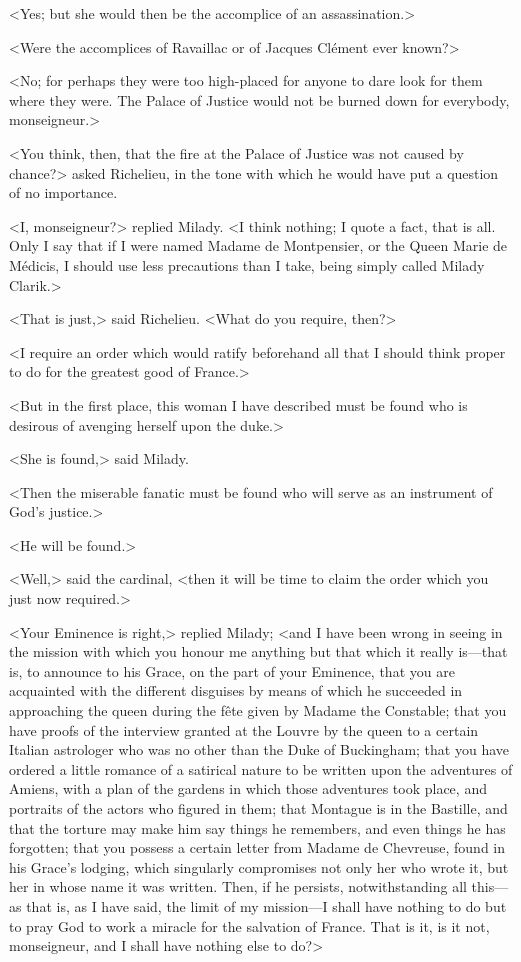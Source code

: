<Yes; but she would then be the accomplice of an assassination.> 

<Were the accomplices of Ravaillac or of Jacques Clément ever known?> 

<No; for perhaps they were too high-placed for anyone to dare look for them where they were. The Palace of Justice would not be burned down for everybody, monseigneur.> 

<You think, then, that the fire at the Palace of Justice was not caused by chance?> asked Richelieu, in the tone with which he would have put a question of no importance. 

<I, monseigneur?> replied Milady. <I think nothing; I quote a fact, that is all. Only I say that if I were named Madame de Montpensier, or the Queen Marie de Médicis, I should use less precautions than I take, being simply called Milady Clarik.> 

<That is just,> said Richelieu. <What do you require, then?> 

<I require an order which would ratify beforehand all that I should think proper to do for the greatest good of France.> 

<But in the first place, this woman I have described must be found who is desirous of avenging herself upon the duke.> 

<She is found,> said Milady. 

<Then the miserable fanatic must be found who will serve as an instrument of God's justice.> 

<He will be found.> 

<Well,> said the cardinal, <then it will be time to claim the order which you just now required.> 

<Your Eminence is right,> replied Milady; <and I have been wrong in seeing in the mission with which you honour me anything but that which it really is---that is, to announce to his Grace, on the part of your Eminence, that you are acquainted with the different disguises by means of which he succeeded in approaching the queen during the fête given by Madame the Constable; that you have proofs of the interview granted at the Louvre by the queen to a certain Italian astrologer who was no other than the Duke of Buckingham; that you have ordered a little romance of a satirical nature to be written upon the adventures of Amiens, with a plan of the gardens in which those adventures took place, and portraits of the actors who figured in them; that Montague is in the Bastille, and that the torture may make him say things he remembers, and even things he has forgotten; that you possess a certain letter from Madame de Chevreuse, found in his Grace's lodging, which singularly compromises not only her who wrote it, but her in whose name it was written. Then, if he persists, notwithstanding all this---as that is, as I have said, the limit of my mission---I shall have nothing to do but to pray God to work a miracle for the salvation of France. That is it, is it not, monseigneur, and I shall have nothing else to do?> 


